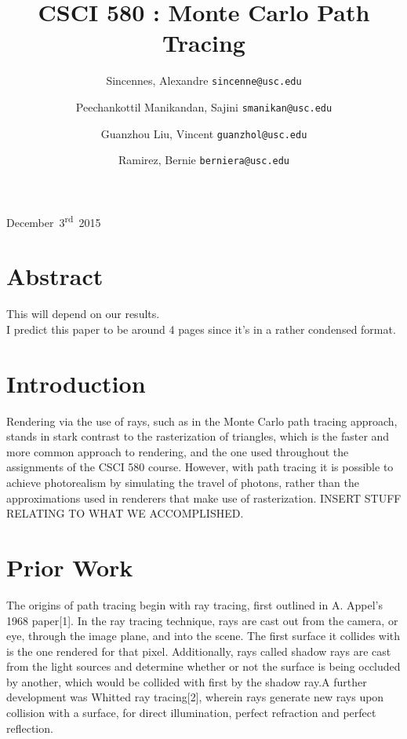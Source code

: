 \documentclass[journal]{IEEEtran}
\begin{document}
\title{CSCI 580 : Monte Carlo Path Tracing}
{December~3\textsuperscript{rd}~2015}
\author{
	Sincennes, Alexandre
	\texttt{sincenne@usc.edu}\\
	\and
 	Peechankottil Manikandan, Sajini
 	\texttt{smanikan@usc.edu}\\
  	\and
	Guanzhou Liu, Vincent
 	\texttt{guanzhol@usc.edu}\\
  	\and
	Ramirez, Bernie
 	\texttt{berniera@usc.edu}\\
  
}
\maketitle


\section{Abstract}
This will depend on our results.\\
I predict this paper to be around 4 pages since it's in a rather condensed format.


\section{Introduction}
Rendering via the use of rays, such as in the Monte Carlo path tracing approach, stands in stark contrast to the rasterization of triangles, which is the faster and more common approach to rendering, and the one used throughout the assignments of the CSCI 580 course. However, with path tracing it is possible to achieve photorealism by simulating the travel of photons, rather than the approximations used in renderers that make use of rasterization. INSERT STUFF RELATING TO WHAT WE ACCOMPLISHED.


\section{Prior Work}
The origins of path tracing begin with ray tracing, first outlined in A. Appel's 1968 paper[1]. In the ray tracing technique, rays are cast out from the camera, or eye, through the image plane, and into the scene. The first surface it collides with is the one rendered for that pixel. Additionally, rays called shadow rays are cast from the light sources and determine whether or not the surface is being occluded by another, which would be collided with first by the shadow ray.A further development was Whitted ray tracing[2], wherein rays generate new rays upon collision with a surface, for direct illumination, perfect refraction and perfect reflection.\\
\end{document}
